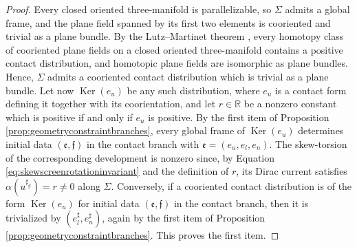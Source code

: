 \documentclass[10pt,reqno,a4paper]{amsart}
\theoremstyle{plain}
\theoremstyle{definition}
\theoremstyle{remark}
\theoremstyle{remark}
\def\fre{\mathfrak{e}}
\newcommand{\Ker}{\operatorname{Ker}}
\renewcommand{\(}{ (}
\renewcommand{\)}{ )}
\newcommand{\frf}{\mathfrak{f}}
\begin{document}
\begin{proof}
Every closed oriented three-manifold is parallelizable, so $\Sigma$ admits a global frame, and the plane field spanned by its first two elements is cooriented and trivial as a plane bundle. By the Lutz--Martinet theorem \cite[Theorem 3.1 and Remark 3.9]{GeigesContactGeometry}, every homotopy class of cooriented plane fields on a closed oriented three-manifold contains a positive contact distribution, and homotopic plane fields are isomorphic as plane bundles. Hence, $\Sigma$ admits a cooriented contact distribution which is trivial as a plane bundle. Let now $\Ker(e_u)$ be any such distribution, where $e_u$ is a contact form defining it together with its coorientation, and let $r\in \mathbb{R}$ be a nonzero constant which is positive if and only if $e_u$ is positive. By the first item of Proposition \ref{prop:geometryconstraintbranches}, every global frame of $\Ker(e_u)$ determines initial data $(\fre,\frf)$ in the contact branch with $\fre = (e_u,e_l,e_n)$. The skew-torsion of the corresponding development is nonzero since, by Equation \eqref{eq:skewscreenrotationinvariant} and the definition of $r$, its Dirac current satisfies $\alpha(u^{\sharp_g}) = r \neq 0$ along $\Sigma$. Conversely, if a cooriented contact distribution is of the form $\Ker(e_u)$ for initial data $(\fre,\frf)$ in the contact branch, then it is trivialized by $(e^{\sharp}_{l},e^{\sharp}_{n})$, again by the first item of Proposition \ref{prop:geometryconstraintbranches}. This proves the first item. 


\end{proof}
\end{document}
